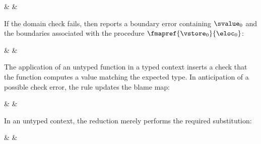 \begin{inlinerrarray}
    &  \nredTX
    & 
    \\
\end{inlinerrarray}

\noindent If the domain check fails, then \Tname{} reports a boundary error
containing $\svalue_0$ and the boundaries associated with the procedure
$\fmapref{\vstore_0}{\eloc_0}$:

\begin{inlinerrarray}
    &  \nredTX
    & 
    \\
\end{inlinerrarray}

The application of an untyped function in a typed context inserts a check that the function
 computes a value matching the expected type.  In anticipation of a possible check error, the
 rule updates the blame map:

\begin{inlinerrarray}
    & \nredTX
    & 
    \\
\end{inlinerrarray}

\noindent In an untyped context, the reduction merely performs the required substitution:

\begin{inlinerrarray}
    &  \nredTX
    & 
    \\
\end{inlinerrarray}

